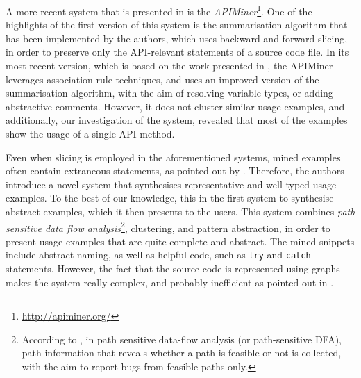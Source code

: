A more recent system that is presented in \cite{Montandon:2013} is the \textit{APIMiner}\footnote{\url{http://apiminer.org/}}. One of the highlights of the first version of this system is the summarisation algorithm that has been implemented by the authors, which uses backward and forward slicing, in order to preserve only the API-relevant statements of a source code file. In its most recent version, which is based on the work presented in \cite{Borges:2014}, the APIMiner leverages association rule techniques, and uses an improved version of the summarisation algorithm, with the aim of resolving variable types, or adding abstractive comments. However, it does not cluster similar usage examples, and additionally, our investigation of the system, revealed that most of the examples show the usage of a single API method.

Even when slicing is employed in the aforementioned systems, mined examples often contain extraneous statements, as pointed out by  \cite{Buse:2012}. Therefore, the authors introduce a novel system that synthesises representative and well-typed usage examples. To the best of our knowledge, this in the first system to synthesise abstract examples, which it then presents to the users. This system combines \textit{path sensitive data flow analysis}\footnote{According to  \cite{Winter:2013}, in path sensitive data-flow analysis (or path-sensitive DFA), path information that reveals whether a path is feasible or not is collected, with the aim to report bugs from feasible paths only.}, clustering, and pattern abstraction, in order to present usage examples that are quite complete and abstract. The mined snippets include abstract naming, as well as helpful code, such as \texttt{try} and \texttt{catch} statements. However, the fact that the source code is represented using graphs makes the system really complex, and probably inefficient as pointed out in \citep{Wang:2013}.